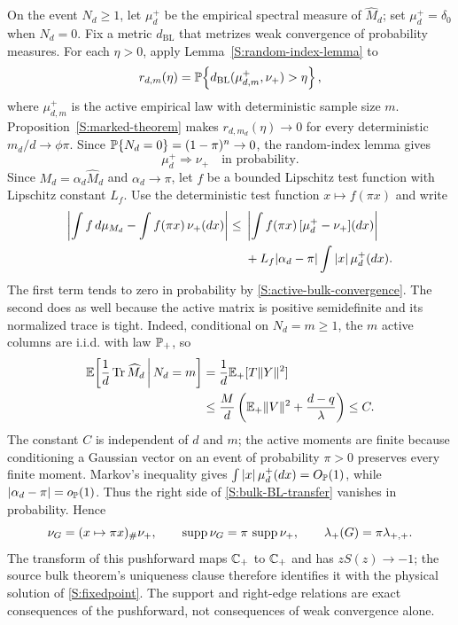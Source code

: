 On the event $N_d\ge1$, let $\mu_d^+$ be the empirical spectral measure
of $\widehat M_d$; set $\mu_d^+=\delta_0$ when $N_d=0$.  Fix a metric
$d_{\mathrm{BL}}$ that metrizes weak convergence of probability measures.
For each $\eta>0$, apply Lemma~\ref{S:random-index-lemma} to
\begin{equation}
r_{d,m}(\eta)
=
\mathbb{P}\!\left\{
 d_{\mathrm{BL}}(\mu_{d,m}^+,\nu_+)>\eta
\right\},
\end{equation}
where $\mu_{d,m}^+$ is the active empirical law with deterministic sample
size $m$.  Proposition~\ref{S:marked-theorem} makes
$r_{d,m_d}(\eta)\to0$ for every deterministic $m_d/d\to\phi\pi$.
Since $\mathbb{P}\{N_d=0\}=(1-\pi)^n\to0$, the random-index lemma gives
\begin{equation}
\mu_d^+\Longrightarrow\nu_+
\quad\text{in probability}.
\label{S:active-bulk-convergence}
\end{equation}
Since $M_d=\alpha_d\widehat M_d$ and $\alpha_d\to\pi$, let $f$ be a
bounded Lipschitz test function with Lipschitz constant $L_f$.  Use the
deterministic test function $x\mapsto f(\pi x)$ and write
\begin{align}
\left|\int f\,d\mu_{M_d}-\int f(\pi x)\,\nu_+(dx)\right|
\le{}&
\left|\int f(\pi x)\,[\mu_d^+-\nu_+](dx)\right|\notag\\
&+L_f|\alpha_d-\pi|\int |x|\,\mu_d^+(dx).
\label{S:bulk-BL-transfer}
\end{align}
The first term tends to zero in probability by
\eqref{S:active-bulk-convergence}. The second does as well because the
active matrix is positive semidefinite and its normalized trace is tight.
Indeed, conditional on $N_d=m\ge1$, the $m$ active columns are i.i.d.
with law $\mathbb{P}_+$, so
\begin{align}
\mathbb{E}\!\left[\frac1d\operatorname{Tr}\widehat M_d\,\middle|\,N_d=m\right]
&=\frac1d\mathbb{E}_+[T\|Y\|^2]\notag\\
&\le \frac{M}{d}
\left(\mathbb{E}_+\|V\|^2+\frac{d-q}{\lambda}\right)
\le C.
\label{S:active-trace-bound}
\end{align}
The constant $C$ is independent of $d$ and $m$; the active moments are
finite because conditioning a Gaussian vector on an event of probability
$\pi>0$ preserves every finite moment.  Markov's inequality gives
$\int|x|\,\mu_d^+(dx)=O_{\mathbb{P}}(1)$, while
$|\alpha_d-\pi|=o_{\mathbb{P}}(1)$. Thus the right side of
\eqref{S:bulk-BL-transfer} vanishes in probability. Hence
\begin{equation}
\nu_G=(x\mapsto\pi x)_\#\nu_+,
\qquad
\operatorname{supp}\nu_G=\pi\,\operatorname{supp}\nu_+,
\qquad
\lambda_+(G)=\pi\lambda_{+,+}.
\label{S:pushforward}
\end{equation}
The transform of this pushforward maps $\mathbb{C}_+$ to $\mathbb{C}_+$ and has
$zS(z)\to-1$; the source bulk theorem's uniqueness clause therefore
identifies it with the physical solution of \eqref{S:fixedpoint}. The support
and right-edge
relations are exact consequences of the pushforward, not consequences of
weak convergence alone.

